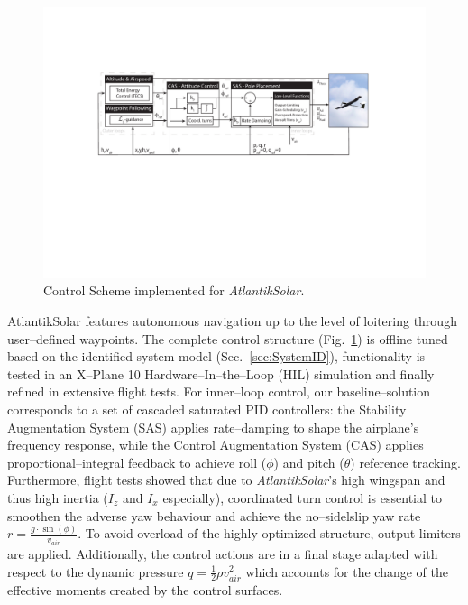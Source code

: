 \begin{figure}[tb]
    \centering
     \includegraphics[width=\linewidth]{images/11_ControlScheme/ControlScheme.pdf}
    \caption{Control Scheme implemented for \textit{AtlantikSolar}.}
    \label{fig:ControlScheme}
\end{figure}

AtlantikSolar features autonomous navigation up to the level of loitering through user--defined waypoints. The complete control structure (Fig.~\ref{fig:ControlScheme}) is offline tuned based on the identified system model (Sec.~\ref{sec:SystemID}), functionality is tested in an X--Plane 10 Hardware--In--the--Loop (HIL) simulation and finally refined in extensive flight tests. For inner--loop control, our baseline--solution corresponds to a set of cascaded saturated PID controllers: the Stability Augmentation System (SAS) applies rate--damping to shape the airplane's frequency response, while the Control Augmentation System (CAS) applies proportional--integral feedback to achieve roll ($\phi$) and pitch ($\theta$) reference tracking. Furthermore, flight tests showed that due to \textit{AtlantikSolar}'s high wingspan and thus high inertia ($I_z$ and $I_x$ especially), coordinated turn control is essential to smoothen the adverse yaw behaviour and achieve the no--sidelslip yaw rate $r=\frac{g\cdot \sin(\phi)}{v_{air}}$. To avoid overload of the highly optimized structure, output limiters are applied. Additionally, the control actions are in a final stage adapted with respect to the dynamic pressure $q=\frac{1}{2}\rho v^{2}_{air}$ which accounts for the change of the effective moments created by the control surfaces. 

